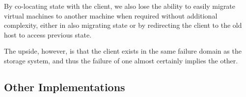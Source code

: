 By co-locating state with the client, we also lose the ability to easily migrate
virtual machines to another machine when required without additional complexity,
either in also migrating state or by redirecting the client to the old host
to access previous state.

The upside, however, is that the client exists in the same failure domain as
the storage system, and thus the failure of one almost certainly implies the
other. 

\subsection{Other Implementations}

